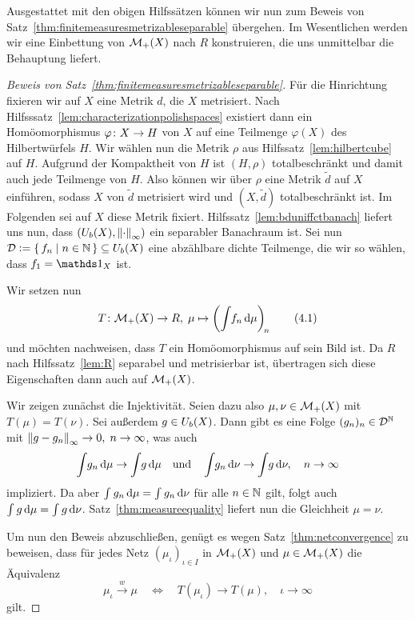 \documentclass[../main/main.tex]{subfiles}
\begin{document}
	Ausgestattet mit den obigen Hilfssätzen können wir nun zum Beweis von Satz~\ref{thm:finitemeasuresmetrizableseparable} übergehen. Im Wesentlichen werden wir eine Einbettung von $\mathcal{M}_{+}(X)$ nach $R$ konstruieren, die uns unmittelbar die Behauptung liefert.
	
	\begin{proof}[Beweis von Satz~\ref{thm:finitemeasuresmetrizableseparable}]
		Für die Hinrichtung fixieren wir auf $X$ eine Metrik $d$, die $X$ metrisiert. 
		Nach Hilfsssatz~\ref{lem:characterizationpolishspaces} existiert dann ein Homöomorphismus $\varphi \colon X \to H$ von
		$X$ auf eine Teilmenge $\varphi(X)$ des Hilbertwürfels $H$. Wir wählen nun die Metrik $\rho$ aus Hilfssatz~\ref{lem:hilbertcube} auf $H$. Aufgrund der Kompaktheit von $H$ ist
		$(H, \rho)$ totalbeschränkt und damit auch jede Teilmenge von $H$. Also können wir über $\rho$ eine Metrik $\tilde{d}$ auf $X$ einführen, sodass $X$ von $\tilde{d}$ 
		metrisiert wird und $(X, \tilde{d})$ totalbeschränkt ist. Im Folgenden sei auf $X$ diese Metrik fixiert. Hilfssatz~\ref{lem:bduniffctbanach} liefert uns nun, dass 
		$(U_b(X), \left\lVert\cdot\right\rVert_\infty)$ ein separabler Banachraum ist. Sei nun $\mathcal{D} \vcentcolon = \left\{\, f_n \; \middle| \; n \in \mathbb{N} \,\right\} \subseteq U_b(X)$ eine abzählbare dichte Teilmenge, 
		die wir so wählen, dass $f_1 = \indfct_X$ ist.
		
		Wir setzen nun
		\[ T \colon \mathcal{M}_{+}(X) \to R, \; \mu \mapsto \left( \int_{} \, f_n \, \mathrm{d}\mu \right)_{\! n}  \label{4.1} \tag{4.1} \]
		und möchten nachweisen, dass $T$ ein Homöomorphismus auf sein Bild ist. Da $R$ nach Hilfssatz~\ref{lem:R} separabel und metrisierbar ist, übertragen sich diese Eigenschaften dann auch auf $\mathcal{M}_{+}(X)$.
		
		Wir zeigen zunächst die Injektivität. Seien dazu also $\mu, \nu \in \mathcal{M}_{+}(X)$ mit $T(\mu) = T(\nu)$. 
		Sei außerdem $g \in U_b(X)$. Dann gibt es eine Folge $(g_n)_n \in \mathcal{D}^{\mathbb{N}}$ mit $\left\lVert g - g_n\right\rVert_\infty \to 0, \; n \to \infty$, was auch 
		\[ \int_{} \, g_n \, \mathrm{d}\mu \to \int_{} \, g \, \mathrm{d}\mu \quad \text{und} \quad \int_{} \, g_n \, \mathrm{d}\nu \to \int_{} \, g \, \mathrm{d}\nu, \quad n \to \infty \]
		impliziert. Da aber $\int_{} \, g_n \, \mathrm{d}\mu = \int_{} \, g_n \, \mathrm{d}\nu$ für alle $n \in \mathbb{N}$ gilt, folgt auch $\int_{} \, g \, \mathrm{d}\mu = \int_{} \, g \, \mathrm{d}\nu$.
		Satz~\ref{thm:measureequality} liefert nun die Gleichheit $\mu = \nu$.
		
		Um nun den Beweis abzuschließen, genügt es wegen Satz~\ref{thm:netconvergence} zu beweisen, dass für jedes Netz $(\mu_\iota)_{\iota \in I}$ in $\mathcal{M}_{+}(X)$ und $\mu \in \mathcal{M}_{+}(X)$ die
		Äquivalenz
		\[ \mu_\iota \xrightarrow{w} \mu \quad \iff \quad T(\mu_\iota) \to T(\mu), \quad \iota \to \infty  \]
		gilt.
		

\end{proof}
\end{document}
